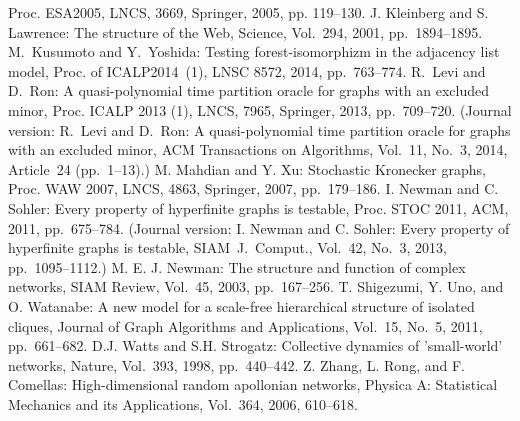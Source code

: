 \documentclass[11pt]{article}
\begin{document}
\begin{thebibliography}{99}
Proc. ESA2005, LNCS, 3669, Springer, 2005, pp. 119--130.
J. Kleinberg and S. Lawrence: 
The structure of the Web, 
Science, Vol.~294, 2001, pp.~1894--1895.
M.~Kusumoto and Y.~Yoshida: 
Testing forest-isomorphizm in the adjacency list model, 
Proc. of ICALP2014~(1), 
LNSC 8572, 2014, pp.~763--774. 
R.~Levi and D.~Ron: 
A quasi-polynomial time partition oracle
for graphs with an excluded minor, 
Proc. ICALP 2013 (1), LNCS, 7965, Springer, 2013, 
pp.~709--720. 
(Journal version: R.~Levi and D.~Ron: 
A quasi-polynomial time partition oracle
for graphs with an excluded minor, 
ACM Transactions on Algorithms, 
Vol.~11, No.~3, 2014, Article~24 (pp.~1--13).)
M. Mahdian and Y. Xu: 
Stochastic Kronecker graphs, 
Proc. WAW 2007, LNCS, 4863, Springer, 2007, pp.~179--186. 
I. Newman and C. Sohler: 
Every property of hyperfinite graphs is testable, 
Proc. STOC 2011, ACM, 2011, pp.~675--784. 
(Journal version: 
I. Newman and C. Sohler: 
Every property of hyperfinite graphs is testable, 
SIAM~J.~Comput., Vol.~42, No.~3, 2013, pp.~1095--1112.)
M. E. J. Newman: The structure and function of complex networks, 
SIAM Review, Vol.~45, 2003, pp.~167--256.
T. Shigezumi, Y. Uno, and O. Watanabe: 
A new model for a scale-free hierarchical structure of isolated cliques, 
Journal of Graph Algorithms and Applications, Vol.~15, No.~5, 2011, pp.~661--682. 
D.J. Watts and S.H. Strogatz: 
Collective dynamics of 'small-world' networks, 
Nature, Vol.~393, 1998, pp.~440--442.
Z. Zhang, L. Rong, and F. Comellas: 
High-dimensional random apollonian networks, 
Physica A: Statistical Mechanics and its Applications, 
Vol.~364, 2006, 610--618.
\end{thebibliography}
\end{document}
